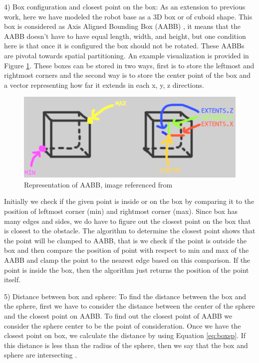 \documentclass[a4paper, 11.5pt, conference]{ieeeconf}      %
\begin{document}
4) Box configuration and closest point on the box:
As an extension to previous work, here we have modeled the robot base as a 3D box or of cuboid shape. This box is considered as Axis Aligned Bounding Box (AABB) \cite{3ddet}, it means that the AABB doesn't have to have equal length, width, and height, but one condition here is that once it is configured the box should not be rotated. These AABBs are pivotal towards spatial partitioning. An example visualization is provided in Figure \ref{fig:aabb}. These boxes can be stored in two ways, first is to store the leftmost and rightmost corners and the second way is to store the center point of the box and a vector representing how far it extends in each x, y, z directions.

\begin{figure}[H]
    \centering
    \includegraphics[scale=0.3]{images/aabb.png}
    \caption{Representation of AABB, image referenced from \cite{3ddet}}
    \label{fig:aabb}
\end{figure}

Initially we check if the given point is inside or on the box by comparing it to the position of leftmost corner (min) and rightmost corner (max). Since box has many edges and sides, we do have to figure out the closest point on the box that is closest to the obstacle. The algorithm to determine the closest point shows that the point will be clamped to AABB, that is we check if the point is outside the box and then compare the position of point with respect to min and max of the AABB and clamp the point to the nearest edge based on this comparison. If the point is inside the box, then the algorithm just returns the position of the point itself.

5) Distance between box and sphere:
To find the distance between the box and the sphere, first we have to consider the distance between the center of the sphere and the closest point on AABB. To find out the closest point of AABB we consider the sphere center to be the point of consideration. Once we have the closest point on box, we calculate the distance by using Equation \ref{eq:boxsp}. If this distance is less than the radius of the sphere, then we say that the box and sphere are intersecting \cite{3ddet}.
\end{document}

